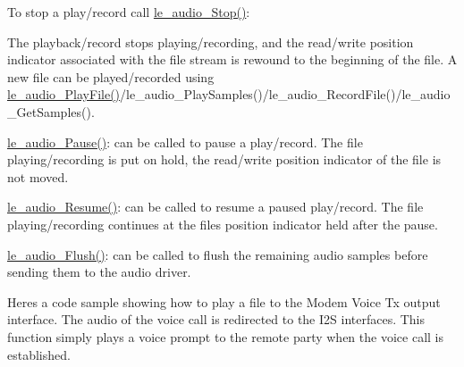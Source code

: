 To stop a play/record call \hyperlink{le__audio__interface_8h_a4aebc6e8cdc4389c375e93418823af71}{le\+\_\+audio\+\_\+\+Stop()}\+:
\begin{DoxyItemize}
\item The playback/record stops playing/recording, and the read/write position indicator associated with the file stream is rewound to the beginning of the file. A new file can be played/recorded using \hyperlink{le__audio__interface_8h_aea2c5d0b394cfab87503639c534300c9}{le\+\_\+audio\+\_\+\+Play\+File()}/le\+\_\+audio\+\_\+\+Play\+Samples()/le\+\_\+audio\+\_\+\+Record\+File()/le\+\_\+audio\+\_\+\+Get\+Samples().
\item \hyperlink{le__audio__interface_8h_a80343ca9800ab80f818bbe0361bb226b}{le\+\_\+audio\+\_\+\+Pause()}\+: can be called to pause a play/record. The file playing/recording is put on hold, the read/write position indicator of the file is not moved.
\item \hyperlink{le__audio__interface_8h_a1dba6618bd8fc9835869ee72c3fbd850}{le\+\_\+audio\+\_\+\+Resume()}\+: can be called to resume a paused play/record. The file playing/recording continues at the file\textquotesingle{}s position indicator held after the pause.
\item \hyperlink{le__audio__interface_8h_a7a5855b7be77110eaca1846b17792597}{le\+\_\+audio\+\_\+\+Flush()}\+: can be called to flush the remaining audio samples before sending them to the audio driver.
\end{DoxyItemize}

Here\textquotesingle{}s a code sample showing how to play a file to the Modem Voice Tx output interface. The audio of the voice call is redirected to the I2\+S interfaces. This function simply plays a voice prompt to the remote party when the voice call is established.


